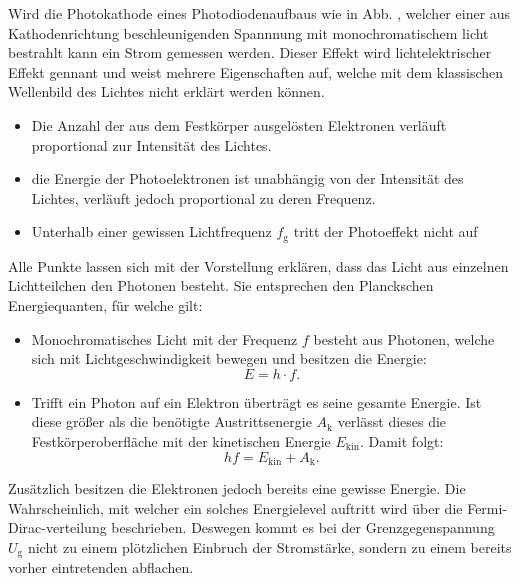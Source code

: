  Wird die Photokathode eines Photodiodenaufbaus wie in Abb. \cite{fig:photodiode}, welcher einer aus Kathodenrichtung
 beschleunigenden Spannnung mit monochromatischem licht bestrahlt kann ein Strom gemessen werden.
 Dieser Effekt wird lichtelektrischer Effekt gennant und weist mehrere Eigenschaften auf, welche mit dem
 klassischen Wellenbild des Lichtes nicht erklärt werden können.
\begin{itemize}
  \item Die Anzahl der aus dem Festkörper ausgelösten Elektronen verläuft
  proportional zur Intensität des Lichtes.
  \item die Energie der Photoelektronen ist unabhängig von der Intensität des
  Lichtes, verläuft jedoch proportional zu deren Frequenz.
  \item Unterhalb einer gewissen Lichtfrequenz $f_\text{g}$ tritt der Photoeffekt nicht auf
\end{itemize}
Alle Punkte lassen sich mit der Vorstellung erklären, dass das Licht aus einzelnen
Lichtteilchen den Photonen besteht. Sie entsprechen den Planckschen Energiequanten,
für welche gilt:
\begin{itemize}
  \item Monochromatisches Licht mit der Frequenz $f$ besteht aus Photonen,
  welche sich mit Lichtgeschwindigkeit bewegen und besitzen die Energie:
  \begin{equation}
    E = h \cdot f\text{.}\label{ITSAPLANCK}
    \end{equation}
    \item Trifft ein Photon auf ein Elektron überträgt es seine gesamte Energie.
    Ist diese größer als die benötigte Austrittsenergie $A_\text{k}$ verlässt
    dieses die Festkörperoberfläche mit der kinetischen Energie $E_\text{kin}$.
    Damit folgt:
    \begin{equation}
      h f = E_\text{kin} +A_\text{k}\text{.}\label{STEVE0ne:---3}
    \end{equation}
\end{itemize}
Zusätzlich besitzen die Elektronen jedoch bereits eine gewisse Energie. Die Wahrscheinlich,
mit welcher ein solches Energielevel auftritt wird über die Fermi-Dirac-verteilung
beschrieben. Deswegen kommt es bei der Grenzgegenspannung $U_\text{g}$ nicht zu
einem plötzlichen Einbruch der Stromstärke, sondern zu einem bereits vorher eintretenden abflachen.
